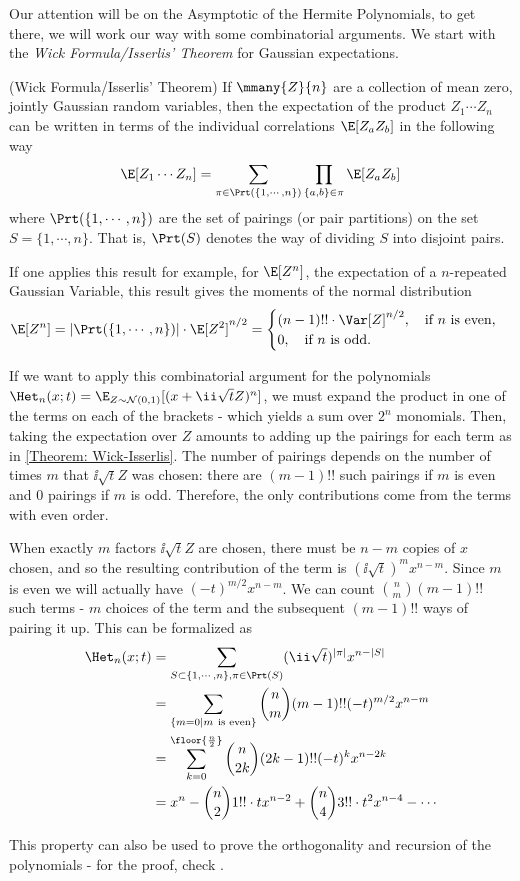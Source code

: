 
Our attention will be on the Asymptotic of the Hermite Polynomials, to get there, we will work our way with some combinatorial arguments. We start with the \textit{Wick Formula/Isserlis' Theorem} for Gaussian expectations.
\begin{thm}
	(Wick Formula/Isserlis' Theorem) If $\mmany{Z}{n}$ are a collection of mean zero, jointly Gaussian random variables, then the expectation of the product $Z_1 \cdots Z_n$ can be written in terms of the individual correlations $\E[Z_a Z_b]$ in the following way
	\begin{equation}
		\E[Z_1 \cdots Z_n] = \sum_{\pi \in \Prt(\{1,\cdots,n\})} \prod_{\{a,b\} \in \pi} \E[Z_a Z_b]
	\end{equation}
	where $\Prt(\{1,\cdots,n\})$ are the set of pairings (or pair partitions) on the set $S = \{1, \cdots, n\}$. That is, $\Prt(S)$ denotes the way of dividing $S$ into disjoint pairs.
	\label{Theorem: Wick-Isserlis}
\end{thm}

If one applies this result for example, for $\E[Z^n]$, the expectation of a $n$-repeated Gaussian Variable, this result gives the moments of the normal distribution
\begin{equation}
	\E[Z^n] = |\Prt(\{1,\cdots,n\})| \cdot \E[Z^2]^{n/2} = 
	\begin{cases}
		(n-1)!! \cdot \Var[Z]^{n/2}, \quad \text{if $n$ is even}, \\
		0, \quad \text{if $n$ is odd}.
	\end{cases}
	\label{Equation: Normal Moments}
\end{equation}

If we want to apply this combinatorial argument for the polynomials $\Het_n(x;t) = \E_{Z \sim \mathcal{N}(0,1)}[(x+\ii \sqrt{t}Z)^n]$, we must expand the product in one of the terms on each of the brackets - which yields a sum over $2^n$ monomials. Then, taking the expectation over $Z$ amounts to adding up the pairings for each term as in \ref{Theorem: Wick-Isserlis}. The number of pairings depends on the number of times $m$ that $\ii \sqrt{t} Z$ was chosen: there are $(m-1)!!$ such pairings if $m$ is even and $0$ pairings if $m$ is odd. Therefore, the only contributions come from the terms with even order.

When exactly $m$ factors $\ii \sqrt{t} Z$ are chosen, there must be $n-m$ copies of $x$ chosen, and so the resulting contribution of the term is $(\ii \sqrt{t})^m x^{n-m}$. Since $m$ is even we will actually have $(-t)^{m/2} x^{n-m}$. We can count $\binom{n}{m}(m-1)!!$ such terms - $m$ choices of the term and the subsequent $(m-1)!!$ ways of pairing it up. This can be formalized as
\begin{align}
	\Het_n(x;t) & = \sum_{S \subset \{1,\cdots,n\}, \pi \in \Prt(S)} (\ii \sqrt{t})^{|\pi|} x^{n-|S|} \\
	& = \sum_{\{m=0 | m \ \text{is even}\}} \binom{n}{m} (m-1)!! (-t)^{m/2} x^{n-m} \\
	& = \sum_{k=0}^{\floor{\frac{n}{2}}} \binom{n}{2k} (2k-1)!! (-t)^{k} x^{n-2k} \\
	& = x^n - \binom{n}{2} 1!! \cdot t x^{n-2} + \binom{n}{4} 3!! \cdot t^2 x^{n-4} - \cdots
\end{align} 

This property can also be used to prove the orthogonality and recursion of the polynomials - for the proof, check \cite{nica2025gaussianintegralformulahermite}.